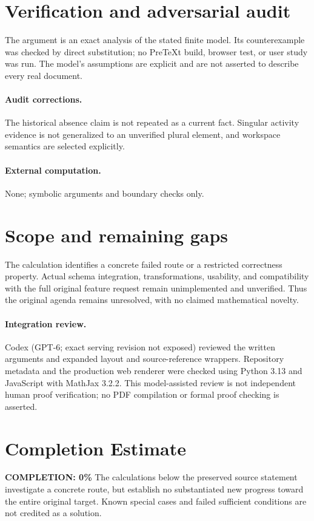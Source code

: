 \documentclass[11pt]{article}
\begin{document}
\section{Verification and adversarial audit}
The argument is an exact analysis of the stated finite model. Its counterexample was checked by direct substitution; no PreTeXt build, browser test, or user study was run. The model's assumptions are explicit and are not asserted to describe every real document.
\paragraph{Audit corrections.} The historical absence claim is not repeated as a current fact. Singular activity evidence is not generalized to an unverified plural element, and workspace semantics are selected explicitly.
\paragraph{External computation.} None; symbolic arguments and boundary checks only.
\section{Scope and remaining gaps}
The calculation identifies a concrete failed route or a restricted correctness property. Actual schema integration, transformations, usability, and compatibility with the full original feature request remain unimplemented and unverified. Thus the original agenda remains unresolved, with no claimed mathematical novelty.
\paragraph{Integration review.} Codex (GPT-6; exact serving revision not exposed) reviewed the written arguments and expanded layout and source-reference wrappers. Repository metadata and the production web renderer were checked using Python 3.13 and JavaScript with MathJax 3.2.2. This model-assisted review is not independent human proof verification; no PDF compilation or formal proof checking is asserted.

\section{Completion Estimate}
\noindent\textbf{COMPLETION: 0\%}
The calculations below the preserved source statement investigate a concrete route,
but establish no substantiated new progress toward the entire original target.
Known special cases and failed sufficient conditions are not credited as a solution.
\end{document}

